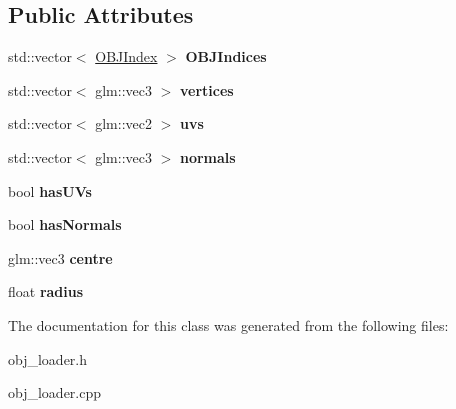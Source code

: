 \subsection*{Public Attributes}
\begin{DoxyCompactItemize}
\item 
std\+::vector$<$ \hyperlink{struct_o_b_j_index}{O\+B\+J\+Index} $>$ {\bfseries O\+B\+J\+Indices}\hypertarget{class_o_b_j_model_a6522870686168e757385b62214abe37b}{}\label{class_o_b_j_model_a6522870686168e757385b62214abe37b}

\item 
std\+::vector$<$ glm\+::vec3 $>$ {\bfseries vertices}\hypertarget{class_o_b_j_model_aa1444e5c0ec8249988d5b7a1f54297c6}{}\label{class_o_b_j_model_aa1444e5c0ec8249988d5b7a1f54297c6}

\item 
std\+::vector$<$ glm\+::vec2 $>$ {\bfseries uvs}\hypertarget{class_o_b_j_model_a66d03d734db51477fce847066d472993}{}\label{class_o_b_j_model_a66d03d734db51477fce847066d472993}

\item 
std\+::vector$<$ glm\+::vec3 $>$ {\bfseries normals}\hypertarget{class_o_b_j_model_af61e5eb97529d47fe8e050fcd0bc976a}{}\label{class_o_b_j_model_af61e5eb97529d47fe8e050fcd0bc976a}

\item 
bool {\bfseries has\+U\+Vs}\hypertarget{class_o_b_j_model_a68c309623f6223858524180eac4c8dff}{}\label{class_o_b_j_model_a68c309623f6223858524180eac4c8dff}

\item 
bool {\bfseries has\+Normals}\hypertarget{class_o_b_j_model_a306f4792cc8b11ffdae23de05e299b07}{}\label{class_o_b_j_model_a306f4792cc8b11ffdae23de05e299b07}

\item 
glm\+::vec3 {\bfseries centre}\hypertarget{class_o_b_j_model_a6c135bd19ee5deda173082d907378cc0}{}\label{class_o_b_j_model_a6c135bd19ee5deda173082d907378cc0}

\item 
float {\bfseries radius}\hypertarget{class_o_b_j_model_a88559cdd84893f4e52b26cc51edeb3ee}{}\label{class_o_b_j_model_a88559cdd84893f4e52b26cc51edeb3ee}

\end{DoxyCompactItemize}


The documentation for this class was generated from the following files\+:\begin{DoxyCompactItemize}
\item 
obj\+\_\+loader.\+h\item 
obj\+\_\+loader.\+cpp\end{DoxyCompactItemize}
